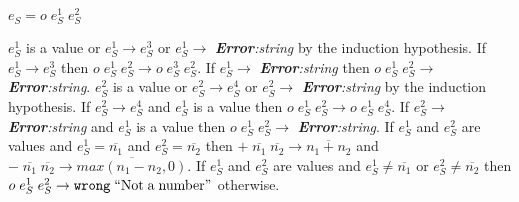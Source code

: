\begin{case}
$e_{S}=o\;e_{S}^{1}\;e_{S}^{2}$

$e_{S}^{1}$ is a value or $e_{S}^{1}\rightarrow e_{S}^{3}$ or $e_{S}^{1}\rightarrow$ \emph{\textbf{Error}:\;string} by the induction hypothesis.  If $e_{S}^{1}\rightarrow e_{S}^{3}$ then $o\;e_{S}^{1}\;e_{S}^{2}\rightarrow o\;e_{S}^{3}\;e_{S}^{2}$.  If $e_{S}^{1}\rightarrow$ \emph{\textbf{Error}:\;string} then $o\;e_{S}^{1}\;e_{S}^{2}\rightarrow$ \emph{\textbf{Error}:\;string}.  $e_{S}^{2}$ is a value or $e_{S}^{2}\rightarrow e_{S}^{4}$ or $e_{S}^{2}\rightarrow$ \emph{\textbf{Error}:\;string} by the induction hypothesis.  If $e_{S}^{2}\rightarrow e_{S}^{4}$ and $e_{S}^{1}$ is a value then $o\;e_{S}^{1}\;e_{S}^{2}\rightarrow o\;e_{S}^{1}\;e_{S}^{4}$.  If $e_{S}^{2}\rightarrow$ \emph{\textbf{Error}:\;string} and $e_{S}^{1}$ is a value then $o\;e_{S}^{1}\;e_{S}^{2}\rightarrow$ \emph{\textbf{Error}:\;string}.  If $e_{S}^{1}$ and $e_{S}^{2}$ are values and $e_{S}^{1}=\overline{n_{1}}$ and $e_{S}^{2}=\overline{n_{2}}$ then $+\;\overline{n_{1}}\;\overline{n_{2}}\rightarrow\overline{n_{1}+n_{2}}$ and $-\;\overline{n_{1}}\;\overline{n_{2}}\rightarrow\overline{max(n_{1}-n_{2},0)}$.  If $e_{S}^{1}$ and $e_{S}^{2}$ are values and $e_{S}^{1}\neq\overline{n_{1}}$ or $e_{S}^{2}\neq\overline{n_{2}}$ then $o\;e_{S}^{1}\;e_{S}^{2}\rightarrow\mathtt{wrong}\;\mathrm{``Not\;a\;number"}$ otherwise.
\end{case}